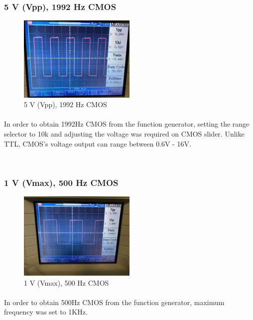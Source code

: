 \documentclass[pdftex,12pt,a4paper]{article}
\begin{document}
\newpage
\begin{flushleft}
\subsubsection{5 V (Vpp), 1992 Hz CMOS}
\begin{figure}[h]
    \centering
	\includegraphics[width=0.5\textwidth]{Photos/5_2_closeup.jpg}
	\caption{5 V (Vpp), 1992 Hz CMOS}
	\label{fig5}
\end{figure}
\paragraph{}
In order to obtain 1992Hz CMOS from the function generator, setting the range selector to 10k and adjusting the voltage was required on CMOS slider. Unlike TTL, CMOS's voltage output can range between 0.6V - 16V.
\end{flushleft}



\
\begin{flushleft}
\subsubsection{1 V (Vmax), 500 Hz CMOS}
\begin{figure}[h]
    \centering
	\includegraphics[width=0.5\textwidth]{Photos/5_3_closeup.jpg}
	\caption{1 V (Vmax), 500 Hz CMOS}
	\label{fig6}
\end{figure}
\paragraph{}
In order to obtain 500Hz CMOS from the function generator, maximum frequency was set to 1KHz. 

\end{flushleft}
\end{document}
